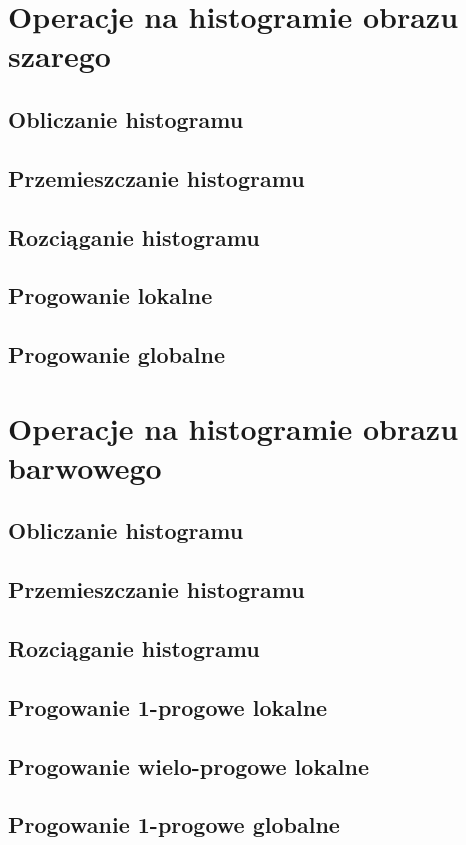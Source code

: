 \documentclass[a4paper,12pt]{book}
\begin{document}
\chapter{Operacje na histogramie obrazu szarego}
\section{Obliczanie histogramu}
\section{Przemieszczanie histogramu}
\section{Rozciąganie histogramu}
\section{Progowanie lokalne}
\section{Progowanie globalne}

\chapter{Operacje na histogramie obrazu barwowego}
\section{Obliczanie histogramu}
\section{Przemieszczanie histogramu}
\section{Rozciąganie histogramu}
\section{Progowanie 1-progowe lokalne}
\section{Progowanie wielo-progowe lokalne}
\section{Progowanie 1-progowe globalne}
\end{document}
